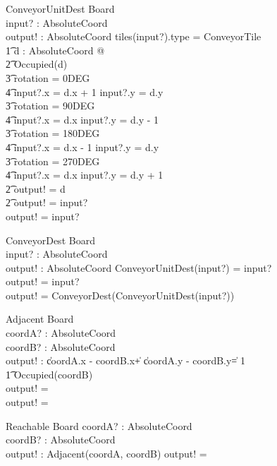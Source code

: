 \documentclass[12pt]{article}
\begin{document}
\begin{schema}{ConveyorUnitDest}
\Xi Board \\
input? : AbsoluteCoord \\
output! : AbsoluteCoord
\where
\IF tiles(input?).type = ConveyorTile \; \; \wedge \\ \t1
\exists d : AbsoluteCoord @ \\ \t2
\IF \neg Occupied(d) \; \; \wedge \\ \t3
rotation = 0DEG \Rightarrow \\ \t4 input?.x = d.x + 1 \wedge input?.y = d.y \\ \t3
rotation = 90DEG \Rightarrow \\ \t4 input?.x = d.x \wedge input?.y = d.y - 1
\\ \t3
rotation = 180DEG \Rightarrow \\ \t4 input?.x = d.x - 1 \wedge input?.y = d.y \\ \t3
rotation = 270DEG \Rightarrow \\ \t4 input?.x = d.x \wedge input?.y = d.y + 1 \\ \t2
\THEN output! = d \\ \t2
\ELSE output! = input? \\
\ELSE output! = input?
\end{schema}

\begin{schema}{ConveyorDest}
\Xi Board \\
input? : AbsoluteCoord \\
output! : AbsoluteCoord
\where
\IF  ConveyorUnitDest(input?) = input? \\
\THEN output! = input? \\
\ELSE output! = ConveyorDest(ConveyorUnitDest(input?))
\end{schema}

\begin{schema}{Adjacent}
\Xi Board \\
coordA? : AbsoluteCoord \\
coordB? : AbsoluteCoord \\
output! : \bool
\where
\IF \|coordA.x - coordB.x\| + \|coordA.y - coordB.y\| = 1 \\ \t1
\neg Occupied(coordB) \\
\THEN output! = \true \\
\ELSE output! = \false
\end{schema}

\begin{schema}{Reachable}
\Xi Board
coordA? : AbsoluteCoord \\
coordB? : AbsoluteCoord \\
output! : \bool
\where
\IF Adjacent(coordA, coordB)
\THEN
output! = \true
\end{schema}
\end{document}
